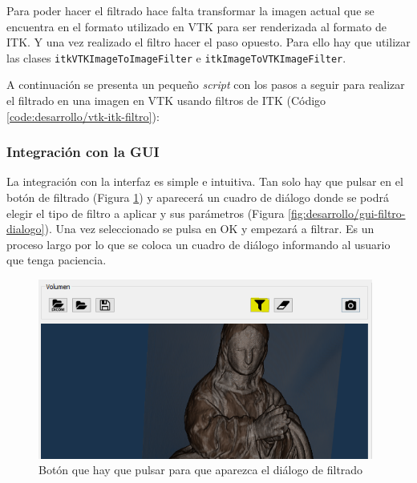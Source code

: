 Para poder hacer el filtrado hace falta transformar la imagen actual que se encuentra en el formato utilizado en VTK para ser renderizada al formato de ITK. Y una vez realizado el filtro hacer el paso opuesto. Para ello hay que utilizar las clases \texttt{itkVTKImageToImageFilter} e \texttt{itkImageToVTKImageFilter}.

A continuación se presenta un pequeño \textit{script} con los pasos a seguir para realizar el filtrado en una imagen en VTK usando filtros de ITK (Código \ref{code:desarrollo/vtk-itk-filtro}):



\subsubsection{Integración con la GUI}

La integración con la interfaz es simple e intuitiva. Tan solo hay que pulsar en el botón de filtrado (Figura \ref{fig:desarrollo/gui-filtro}) y aparecerá un cuadro de diálogo donde se podrá elegir el tipo de filtro a aplicar y sus parámetros (Figura \ref{fig:desarrollo/gui-filtro-dialogo}). Una vez seleccionado se pulsa en OK y empezará a filtrar. Es un proceso largo por lo que se coloca un cuadro de diálogo informando al usuario que tenga paciencia.

\begin{figure}[H]
	\centering
	\includegraphics[width=11cm]{imagenes/desarrollo/gui-filtro}
	\caption{Botón que hay que pulsar para que aparezca el diálogo de filtrado}
	\label{fig:desarrollo/gui-filtro}
\end{figure}

